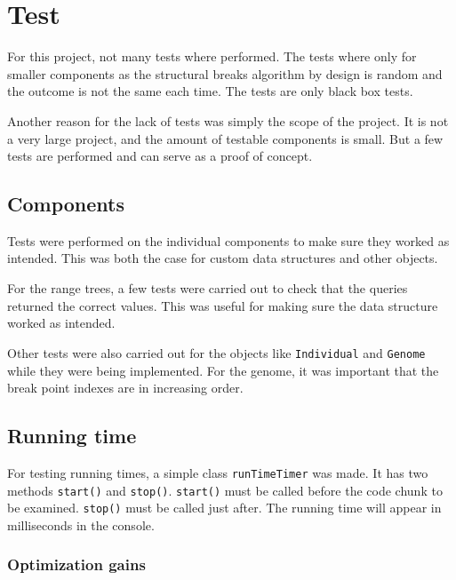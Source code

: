 
\clearpage
\section{Test} \label{sec:test}

For this project, not many tests where performed. The tests where only for
smaller components as the structural breaks algorithm by design is random and
the outcome is not the same each time. The tests are only black box tests. 

Another reason for the lack of tests was simply the scope of the project. It is
not a very large project, and the amount of testable components is small. But a
few tests are performed and can serve as a proof of concept. 

\subsection{Components}

Tests were performed on the individual components to make sure they worked as
intended. This was both the case for custom data structures and other objects. 

For the range trees, a few tests were carried out to check that the queries
returned the correct values. This was useful for making sure the data
structure worked as intended.  

Other tests were also carried out for the objects like \texttt{Individual} and
\texttt{Genome} while they were being implemented. For the genome, it was
important that the break point indexes are in increasing order. 

\subsection{Running time} \label{sec:test-running-time}

For testing running times, a simple class \texttt{runTimeTimer} was made. It has
two methods \texttt{start()} and \texttt{stop()}. \texttt{start()} must be called
before the code chunk to be examined. \texttt{stop()} must be called just after.
The running time will appear in milliseconds in the console.

\subsubsection{Optimization gains} \label{sec:optimization-gains}

